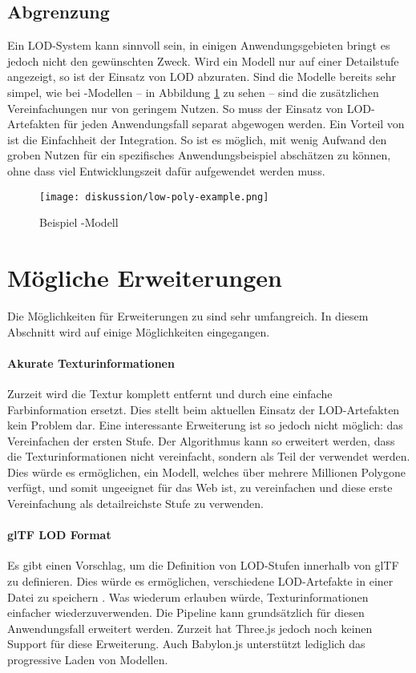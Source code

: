 \subsection{Abgrenzung}

Ein LOD-System kann sinnvoll sein, in einigen Anwendungsgebieten bringt es jedoch nicht den gewünschten Zweck. Wird ein Modell nur auf einer Detailstufe angezeigt, so ist der Einsatz von LOD abzuraten. Sind die Modelle bereits sehr simpel, wie bei -Modellen – in Abbildung \ref{fig:lowPolyExample} zu sehen – sind die zusätzlichen Vereinfachungen nur von geringem Nutzen.
So muss der Einsatz von LOD-Artefakten für jeden Anwendungsfall separat abgewogen werden. Ein Vorteil von  ist die Einfachheit der Integration. So ist es möglich, mit wenig Aufwand den groben Nutzen für ein spezifisches Anwendungsbeispiel abschätzen zu können, ohne dass viel Entwicklungszeit dafür aufgewendet werden muss.

\begin{figure}[H]
  \centering
  \texttt{[image: diskussion/low-poly-example.png]}
  \caption{Beispiel -Modell}
  \label{fig:lowPolyExample}
\end{figure}

\section{Mögliche Erweiterungen}
Die Möglichkeiten für Erweiterungen zu  sind sehr umfangreich. In diesem Abschnitt wird auf einige Möglichkeiten eingegangen.

\paragraph{Akurate Texturinformationen}
Zurzeit wird die Textur komplett entfernt und durch eine einfache Farbinformation ersetzt. Dies stellt beim aktuellen Einsatz der LOD-Artefakten kein Problem dar. Eine interessante Erweiterung ist so jedoch nicht möglich: das Vereinfachen der ersten Stufe. Der Algorithmus kann so erweitert werden, dass die Texturinformationen nicht vereinfacht, sondern als Teil der  verwendet werden. Dies würde es ermöglichen, ein Modell, welches über mehrere Millionen Polygone verfügt, und somit ungeeignet für das Web ist, zu vereinfachen und diese erste Vereinfachung als detailreichste Stufe zu verwenden.

\paragraph{glTF LOD Format}
Es gibt einen Vorschlag, um die Definition von LOD-Stufen innerhalb von glTF zu definieren. Dies würde es ermöglichen, verschiedene LOD-Artefakte in einer Datei zu speichern \cite{glTFExtensionLOD}. Was wiederum erlauben würde, Texturinformationen einfacher wiederzuverwenden. Die Pipeline kann grundsätzlich für diesen Anwendungsfall erweitert werden.
Zurzeit hat Three.js jedoch noch keinen Support für diese Erweiterung. Auch Babylon.js unterstützt lediglich das progressive Laden von Modellen. \cite{babylonProgressiveLoading}


